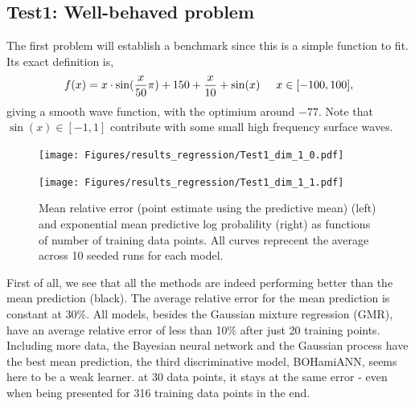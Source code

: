 \subsection*{Test1: Well-behaved problem}
The first problem will establish a benchmark since this is a simple function to fit. Its exact definition is,
$$f(x) = x\cdot \sin(\frac{x}{50} \pi) + 150 + \frac{x}{10} + \sin(x) \hspace{0.5cm} x \in [-100,100],$$
giving a smooth wave function, with the optimium around $-77$. Note that $\sin(x)\in [-1,1]$ contribute with
some small high frequency surface waves. 

\begin{figure}[H]
  \centering
  \begin{minipage}[b]{0.49\textwidth}
   \texttt{[image: Figures/results\_regression/Test1\_dim\_1\_0.pdf]}
  \end{minipage}
  \hfill
  \begin{minipage}[b]{0.49\textwidth}
    \texttt{[image: Figures/results\_regression/Test1\_dim\_1\_1.pdf]}
   \end{minipage}
  \caption{Mean relative error (point estimate using the predictive mean) (left) and exponential mean predictive log probalility (right) as
  functions of number of training data points. All curves reprecent the average across 10 seeded runs for each
  model.}
  \label{Test1_reg_plot}
\end{figure}

First of all, we see that all the methods are indeed performing better than the mean prediction
(black). The average relative error for the mean prediction is constant at 30\%. All models, besides the
Gaussian mixture regression (GMR), have an average relative error of less than 10\% after just 20 training
points. Including more data, the Bayesian neural network and the Gaussian process have the best mean prediction, 
the third discriminative model, BOHamiANN, seems here to be a weak learner. at 30 data points, it stays at the
same error - even when being presented for 316 training data points in the end. 

